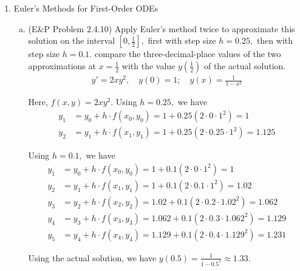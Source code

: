 \documentclass{article}
\begin{document}
\begin{enumerate}
	\item Euler's Methods for First-Order ODEs
		\begin{enumerate}[(a)]
			\item (E\&P Problem 2.4.10) Apply Euler's method twice to approximate this solution on the interval $\left[ 0, \frac{1}{2} \right],$ first with step size $h=0.25,$ then with step size $h=0.1.$ compare the three-decimal-place values of the two approximations at $x=\frac{1}{2}$ with the value $y\left( \frac{1}{2} \right)$ of the actual solution.
				\begin{align*}
					y'=2xy^2, \quad y(0)=1; \quad y(x)=\frac{1}{1-x^2}
				\end{align*}
				\begin{soln}
					Here, $f(x, y)=2xy^2.$ Using $h=0.25,$ we have
					\begin{align*}
						y_1 &= y_0 + h\cdot f(x_0, y_0) = 1 + 0.25(2\cdot 0\cdot 1^2) = 1 \\
						y_2 &= y_1 + h\cdot f(x_1, y_1) = 1 + 0.25(2\cdot 0.25\cdot 1^2) = 1.125
					\end{align*}

					Using $h=0.1,$ we have
					\begin{align*}
						y_1 &= y_0 + h\cdot f(x_0, y_0) = 1 + 0.1(2\cdot 0\cdot 1^2) = 1 \\
						y_2 &= y_1 + h\cdot f(x_1, y_1) = 1+0.1(2\cdot 0.1\cdot 1^2)=1.02 \\
						y_3 &= y_2 + h\cdot f(x_2, y_2) = 1.02 + 0.1(2\cdot 0.2\cdot 1.02^2) = 1.062 \\
						y_4 &= y_3 + h\cdot f(x_3, y_3) = 1.062 + 0.1(2\cdot 0.3\cdot 1.062^2) = 1.129 \\
						y_5 &= y_4 + h\cdot f(x_4, y_4) = 1.129 + 0.1(2\cdot 0.4\cdot 1.129^2) = 1.231
					\end{align*}

					Using the actual solution, we have $y(0.5)=\frac{1}{1-0.5^2} \approx 1.33.$
				\end{soln}


\end{enumerate}
\end{enumerate}
\end{document}
